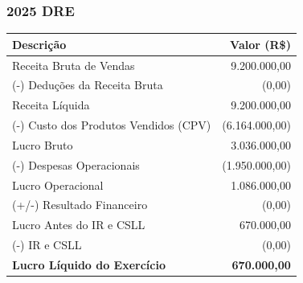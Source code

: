 \subsubsection{2025 DRE}
 \begin{tabular}{p{10cm} r}                                                     
  \toprule                                                                       
 \textbf{Descrição} & \textbf{Valor (R\$)} \\                                   
 \midrule                                                                       
 Receita Bruta de Vendas & 9.200.000,00 \\                                         
 (-) Deduções da Receita Bruta & (0,00) \\                                 
 \midrule                                                                       
 Receita Líquida & 9.200.000,00 \\                                                 
 (-) Custo dos Produtos Vendidos (CPV) & (6.164.000,00) \\                         
 \midrule                                                                       
 Lucro Bruto & 3.036.000,00 \\                                                     
 (-) Despesas Operacionais & (1.950.000,00) \\                                     
 \midrule                                                                       
 Lucro Operacional & 1.086.000,00 \\                                               
 (+/-) Resultado Financeiro & (0,00) \\                                     
 \midrule                                                                       
 Lucro Antes do IR e CSLL & 670.000,00 \\                                        
 (-) IR e CSLL & (0,00) \\                                                  
 \midrule                                                                       
 \textbf{Lucro Líquido do Exercício} & \textbf{670.000,00} \\                    
 \bottomrule                                                                    
 \end{tabular}                                                                  
